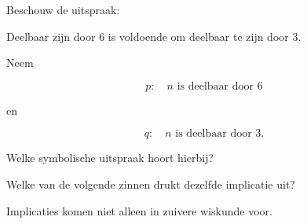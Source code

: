 \documentclass{ximera}
\begin{document}
\begin{oefening}{\oefU\ESS}

Beschouw de uitspraak:

\begin{center}
Deelbaar zijn door $6$ is voldoende om deelbaar te zijn door $3$.
\end{center}

Neem

\[
p:\quad n\text{ is deelbaar door }6
\]

en

\[
q:\quad n\text{ is deelbaar door }3.
\]

\begin{question}

Welke symbolische uitspraak hoort hierbij?

\begin{multipleChoice}




\end{multipleChoice}

\end{question}

\begin{question}

Welke van de volgende zinnen drukt dezelfde implicatie uit?

\begin{multipleChoice}




\end{multipleChoice}

\end{question}

\end{oefening}



Implicaties komen niet alleen in zuivere wiskunde voor.
\end{document}
